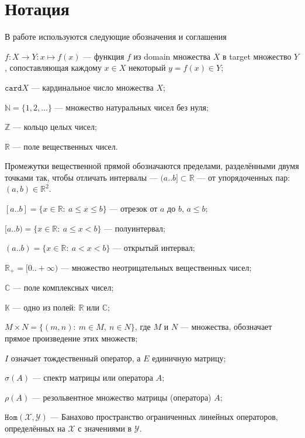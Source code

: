 \documentclass[14pt,a4paper]{extarticle}
\numberwithin{equation}{section}
\theoremstyle{definition}
\begin{document}
\section*{Нотация}

В работе используются следующие обозначения и соглашения

\( f: X\to Y: x\mapsto f(x) \) --- функция \( f \)
из domain множества \( X \) в target множество \( Y \),
сопоставляющая каждому \( x\in X \) некоторый \( y=f(x) \in Y\);

\( \mathtt{card}X \) --- кардинальное число множества \( X \);

\( \mathbb{N} = \{ 1, 2, \ldots \}\) --- множество натуральных чисел без нуля;

\( \mathbb{Z} \) --- кольцо целых чисел;

\( \mathbb{R} \) --- поле вещественных чисел.

Промежутки вещественной прямой обозначаются пределами, раз\-дел\-ёнными двумя
точками так, чтобы отличать интервалы  ---
\( (a..b] \subset \mathbb{R} \) --- от упорядоченных пар: \( (a, b)\in\mathbb{R}^2 \).

\( [a..b] = \{ x\in\mathbb{R}:\ a\leq x\leq b\} \) --- отрезок
от \( a \) до \( b \), \( a\leq b \);

\( [a..b) = \{ x\in\mathbb{R}:\ a\leq x < b\} \) --- полуинтервал;

\( (a..b) = \{ x\in\mathbb{R}:\ a < x < b\} \) --- открытый интервал;

\( \mathbb{R}_+ = [0..+\infty) \) --- множество неотрицательных вещественных чисел;

\( \mathbb{C} \) --- поле комплексных чисел;

\( \mathbb{K} \) --- одно из полей: \( \mathbb{R} \) или \( \mathbb{C} \);

\( M{\times}N = \{ (m, n):\ m{\in}M,\ n{\in}N \} \), где \( M \) и \( N \)
--- множества, обозначает прямое произведение этих множеств;

\( I \) означает тождественный оператор, а \( E \) единичную матрицу;

\( \sigma(A) \) --- спектр матрицы или оператора \( A \);

\( \rho(A) \) --- резольвентное множество матрицы (оператора) \( A \);

\( \mathtt{Hom}(\mathscr{X}, \mathscr{Y})\) --- Банахово пространство ограни\-чен\-ных
линейных операторов, определённых на \( \mathscr{X} \) с значениями в \( \mathscr{Y} \).
\end{document}

